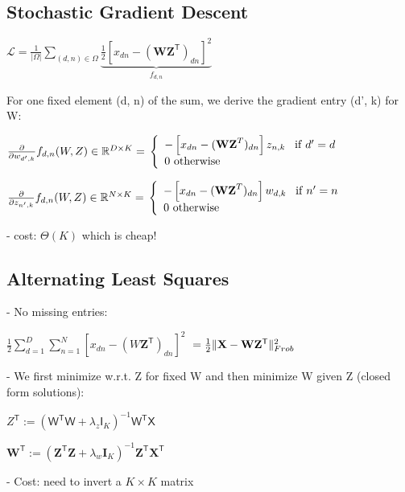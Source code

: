 \subsection*{Stochastic Gradient Descent}

$\mathcal{L} = \frac{1}{|\Omega|} \sum_{(d,n)\in\Omega}\underbrace{{\frac{1}{2}}[x_{d n}-(\mathbf{W}\mathbf{Z}^{\textsf{T}})_{d n}]^{2}}_{f_{d,n}}$

For one fixed element (d, n) of the sum, we derive the gradient entry (d', k) for W:

${\frac{\partial}{\partial w_{d^{\prime},k}}}f_{d,n}(W, Z) \in \mathbb{R}^{D\times K}=\\\left\{\begin{array}{l l}{-\left[x_{d n}-({\bf W Z}^{T})_{d n}\right]z_{n,k}\;\;\;\mathrm{if}\;d^{\prime}=d} \\ {0 \mathrm{~otherwise}}\end{array}\right.$

${\frac{\partial}{\partial z_{n^{\prime},k}}}f_{d,n}(W, Z)\in \mathbb{R}^{N\times K}=\\\left\{\begin{array}{l l}{-\left[x_{d n}-({\bf W Z}^{T})_{d n}\right]w_{d,k}\;\;\;\mathrm{if}\;n^{\prime}=n} \\ {0 \mathrm{~otherwise}}\end{array}\right.$

- cost: $\Theta(K)$ which is cheap!

\subsection*{Alternating Least Squares}

- No missing entries:

${\textstyle\frac{1}{2}}\sum_{d=1}^{D}\sum_{n=1}^{N}\left[x_{d n}-\left(W\mathbf{Z}^{\mathsf{T}}\right)_{d n}\right]^{2}$
$\\=\frac{1}{2}\|\mathbf{X}-\mathbf{W}\mathbf{Z}^{\mathsf{T}}\|_{{Frob}}^{2}$

- We first minimize w.r.t. Z for fixed W and then minimize W given Z (closed form solutions):

$Z^{\mathsf{T}}:=(\mathsf{W}^{\mathsf{T}}\mathsf{W}+\lambda_{z}\mathsf{I}_{K})^{-1}\mathsf{W}^{\mathsf{T}}\mathsf{X}$

$\mathbf{W}^{\mathsf{T}}:=(\mathbf{Z}^{\mathsf{T}}\mathbf{Z}+\lambda_{w}\mathbf{I}_{K})^{-1}\mathbf{Z}^{\mathsf{T}}\mathbf{X}^{\mathsf{T}}$

- Cost: need to invert a $K \times K$ matrix

